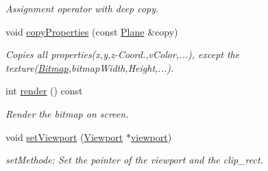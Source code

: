\begin{DoxyCompactItemize}
\begin{DoxyCompactList}\small\item\em Assignment operator with deep copy. \item\end{DoxyCompactList}\item 
void \hyperlink{class_f2_c_1_1_plane_ac3ee4529b515cc641b6e9b27d76fc2ef}{copyProperties} (const \hyperlink{class_f2_c_1_1_plane}{Plane} \&copy)
\begin{DoxyCompactList}\small\item\em Copies all properties(x,y,z-\/Coord.,vColor,...), except the texture(\hyperlink{class_f2_c_1_1_bitmap}{Bitmap},bitmapWidth,Height,...). \item\end{DoxyCompactList}\item 
int \hyperlink{class_f2_c_1_1_plane_ace8103ddb3071c72aa40fff492c23135}{render} () const 
\begin{DoxyCompactList}\small\item\em Render the bitmap on screen. \item\end{DoxyCompactList}\item 
void \hyperlink{class_f2_c_1_1_plane_a22fe65ae565a11384d5ea1d44d705b1a}{setViewport} (\hyperlink{class_f2_c_1_1_viewport}{Viewport} $\ast$\hyperlink{class_f2_c_1_1_plane_a755aaa0644174adc1574d04a1378c22f}{viewport})
\begin{DoxyCompactList}\small\item\em setMethode: Set the pointer of the viewport and the clip\_\-rect. \item\end{DoxyCompactList}\end{DoxyCompactItemize}
